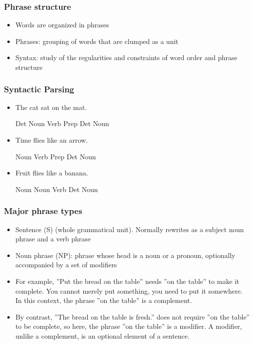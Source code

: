 \begin{frame}[fragile]
  \frametitle{Phrase structure}
  \begin{itemize}
  \item Words are organized in phrases
  \item Phrases: grouping of words that are clumped as a unit
  \item Syntax: study of the regularities and constraints of word order and phrase structure
  \end{itemize}
\end{frame}


\begin{frame}[fragile]
  \frametitle{Syntactic Parsing}
  \begin{itemize}
  \item  The cat sat on the mat.
  
Det Noun Verb Prep Det Noun
  \item Time flies like an arrow.
  
Noun  Verb     Prep Det Noun
  \item Fruit flies like a banana.
  
Noun  Noun    Verb Det Noun
  \end{itemize}
\end{frame}

  
 

\begin{frame}[fragile]
  \frametitle{Major phrase types}
  \begin{itemize}
  \item Sentence (S) (whole grammatical unit). Normally rewrites as a subject noun phrase and a verb phrase
  \item Noun phrase (NP): phrase whose head is a noun or a pronoun, optionally accompanied by a set of modifiers 
  \item   For example, ''Put the bread on the table'' needs ''on the table'' to make it complete. You cannot merely put something, you need to put it somewhere. In this context, the phrase ''on the table'' is a complement. 
  \item By contrast, ''The bread on the table is fresh.'' does not require ''on the table'' to be complete, so here, the phrase ''on the table'' is a modifier. A modifier, unlike a complement, is an optional element of a sentence. 
  \end{itemize}
\end{frame}

